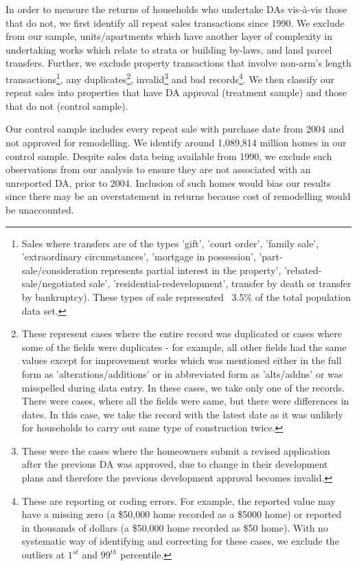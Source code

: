 \documentclass[AEJ,reqno, draftmode]{AEA} %
\begin{document}
In order to measure the returns of households who undertake DAs vis-à-vis those that do not, we first identify all repeat sales transactions since 1990. We exclude from our sample, units/apartments which have another layer of complexity in undertaking works which relate to strata or building by-laws, and land parcel transfers. Further, we exclude property transactions that involve non-arm's length transactions\footnote{Sales where transfers are of the types 'gift', 'court order', 'family sale', 'extraordinary circumstances', 'mortgage in possession', 'part-sale/consideration represents partial interest in the property', 'rebated-sale/negotiated sale', 'residential-redevelopment', transfer by death or transfer by bankruptcy). These types of sale represented ~3.5\% of the total population data set.}, any duplicates\footnote{These represent cases where the entire record was duplicated or cases where some of the fields were duplicates - for example, all other fields had the same values except for improvement works which was mentioned either in the full form as 'alterations/additions' or in abbreviated form  as 'alts/addns' or was misspelled during data entry. In these cases, we take only one of the records. There were cases, where all the fields were same, but there were differences in dates. In this case, we take the record with the latest date as it was unlikely for households to carry out same type of construction twice.}, invalid\footnote{These were the cases where the homeowners submit a revised application after the previous DA was approved, due to change in their development plans and therefore the previous development approval becomes invalid.} and bad records\footnote{These are reporting or coding errors. For example, the reported value may have a missing zero (a \$50,000 home recorded as a \$5000 home) or reported in thousands of dollars (a \$50,000 home recorded as \$50 home). With no systematic way of identifying and correcting for these cases, we exclude the outliers at $1^{st}$ and $99^{th}$ percentile.}. We then classify our repeat sales into properties that have DA approval (treatment sample) and those that do not (control sample). 

Our control sample includes every repeat sale with purchase date from 2004 and not approved for remodelling. We identify around 1,089,814 million homes in our control sample. Despite sales data being available from 1990, we exclude such observations from our analysis to ensure they are not associated with an unreported DA, prior to 2004. Inclusion of such homes would bias our results since there may be an overstatement in returns because cost of remodelling would be unaccounted.
\end{document}
